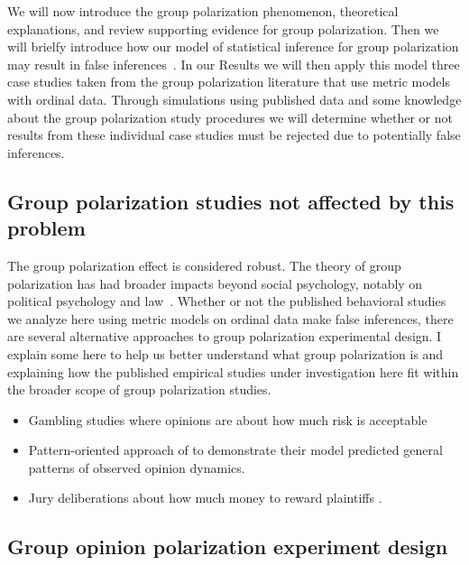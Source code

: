 \documentclass[11pt,letterpaper]{article}
\begin{document}
We will now introduce the group polarization
phenomenon, theoretical explanations, and review supporting evidence for
group polarization. Then we will
brielfy introduce how our model of statistical inference for group 
polarization may result in false inferences~\cite{Liddell2018}. In our
Results we will then apply this model three case studies taken from the
group polarization literature that use metric models with ordinal data.
Through simulations using published data and some knowledge about the
group polarization study procedures we will determine whether or not
results from these individual case studies must be rejected due to 
potentially false inferences.

\subsection{Group polarization studies not affected by this problem}

The group polarization effect is considered robust. The theory of group polarization has had
broader impacts beyond social psychology, notably on political psychology
and law~\cite{Sunstein2002,Sunstein2009,Sunstein2019}. Whether or not the 
published behavioral studies we analyze here using metric models on 
ordinal data make false inferences,  there are several alternative approaches
to group polarization experimental design. I explain some here to help us
better understand what group polarization is and explaining how the 
published empirical studies under investigation here fit within the broader
scope of group polarization studies.

\begin{itemize}
  \item Gambling studies where opinions are about how much risk is 
    acceptable \cite{Blascovich1973,Blascovich1974,Blascovich1975,Blascovich1975a,Blascovich1976}
  \item Pattern-oriented approach of  to demonstrate their
    model predicted general patterns of observed opinion dynamics.
  \item Jury deliberations about how much money to reward plaintiffs
    \cite{Myers1976,Kaplan1977,Schkade2000}.
\end{itemize}

\subsection{Group opinion polarization experiment design}
\end{document}
